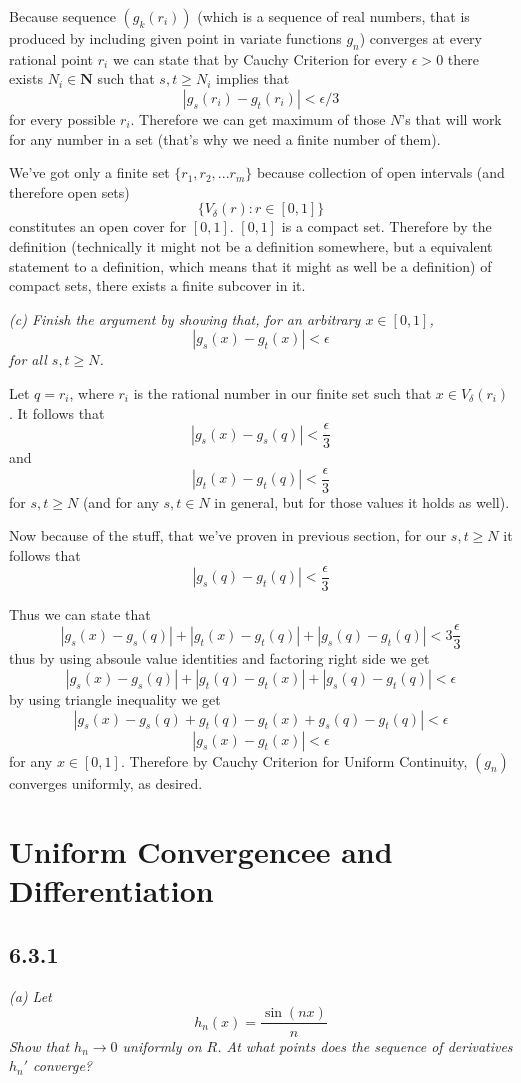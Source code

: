 \documentclass[11pt,oneside,titlepage]{book}
\begin{document}
Because sequence  $(g_k(r_i))$ (which is a sequence of real numbers, that is
produced by including given point in variate functions  $g_n$)
converges at every rational point $r_i$ we can state
that by Cauchy Criterion for every $\epsilon > 0$  there exists
$N_i \in \textbf{N}$ such that $s, t \geq N_i$ implies that
$$|g_s(r_i) - g_t(r_i)| < \epsilon/3$$
for every possible $r_i$. Therefore we can get maximum of those $N$'s
that will work for any number in a set (that's why we need a finite number
of them).

We've got only a finite set $\{r_1, r_2, ... r_m\}$ because collection of
open intervals (and therefore open sets)
$$\{V_\delta(r): r \in [0, 1]\}$$
constitutes an open cover for $[0, 1]$. $[0, 1]$ is a compact set.
Therefore by the definition (technically
it might not be a definition somewhere,
but a equivalent statement to a definition,
which means that it might as well be a definition) of compact sets,
there exists a finite subcover in it.

\textit{(c) Finish the argument by showing that, for an arbitrary
  $x \in [0, 1]$,}
$$|g_s(x) - g_t(x)| < \epsilon$$
\textit{for all $s, t \geq N$.}

Let $q = r_i$, where $r_i$ is the rational number in our finite set
such that $x \in V_\delta(r_i)$.
It follows that 
$$|g_s(x) - g_s(q)| < \frac{\epsilon}{3}$$
and 
$$|g_t(x) - g_t(q)| < \frac{\epsilon}{3}$$
for $s, t \geq N$ (and for any $s, t \in N$ in general, but for those
values it holds as well).

Now because of the stuff, that we've proven in previous section, for
our  $s, t \geq N$ it follows that 
$$|g_s(q) - g_t(q)| < \frac{\epsilon}{3}$$

Thus we can state that
$$|g_s(x) - g_s(q)| + |g_t(x) - g_t(q)| + |g_s(q) - g_t(q)|
< 3\frac{\epsilon}{3}$$
thus by  using absoule value identities and factoring right side we get
$$|g_s(x) - g_s(q)| + |g_t(q) - g_t(x)| + |g_s(q) - g_t(q)| < \epsilon$$
by using triangle inequality we get
$$|g_s(x) - g_s(q) + g_t(q) - g_t(x) + g_s(q) - g_t(q)| < \epsilon$$
$$|g_s(x) - g_t(x) | < \epsilon$$
for any $x \in [0, 1]$. Therefore by Cauchy Criterion for Uniform Continuity,
$(g_n)$ converges uniformly, as desired.

\section{Uniform Convergencee and Differentiation}

\subsection*{6.3.1}
\textit{(a) Let }
$$h_n(x) = \frac{\sin{(nx)}}{n}$$
\textit{Show that $h_n \to 0$ uniformly on $R$. At what points does the
  sequence of derivatives $h_n'$ converge?}
\end{document}
